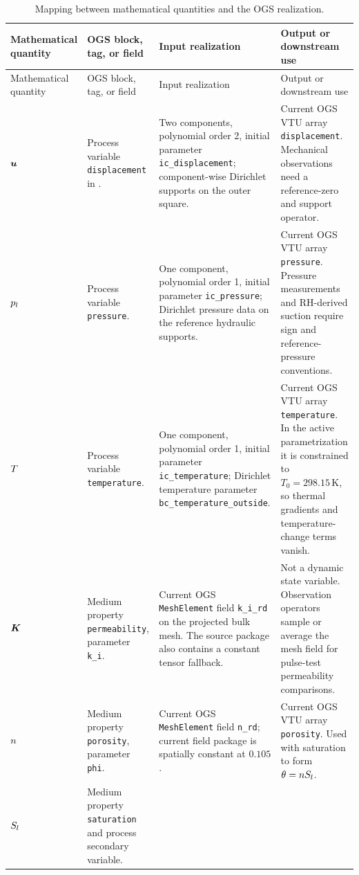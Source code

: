 \begingroup
\small
\setlength{\tabcolsep}{3pt}
\begin{longtable}{@{}L{0.15\textwidth} L{0.27\textwidth} L{0.25\textwidth} L{0.23\textwidth}@{}}
\caption{Mapping between mathematical quantities and the OGS realization.}
\label{tab:ogs-field-mapping}\\
\toprule
Mathematical quantity & OGS block, tag, or field & Input realization & Output or downstream use\\
\midrule
\endfirsthead
\toprule
Mathematical quantity & OGS block, tag, or field & Input realization & Output or downstream use\\
\midrule
\endhead
\bottomrule
\endlastfoot
\(\bm{u}\) &
Process variable \texttt{displacement} in . &
Two components, polynomial order 2, initial parameter \texttt{ic\_displacement};
component-wise Dirichlet supports on the outer square. &
Current OGS VTU array \texttt{displacement}.  Mechanical observations need a
reference-zero and support operator.\\
\(p_l\) &
Process variable \texttt{pressure}. &
One component, polynomial order 1, initial parameter \texttt{ic\_pressure};
Dirichlet pressure data on the reference hydraulic supports. &
Current OGS VTU array \texttt{pressure}.  Pressure measurements and RH-derived
suction require sign and reference-pressure conventions.\\
\(T\) &
Process variable \texttt{temperature}. &
One component, polynomial order 1, initial parameter \texttt{ic\_temperature};
Dirichlet temperature parameter \texttt{bc\_temperature\_outside}. &
Current OGS VTU array \texttt{temperature}.  In the active parametrization it is
constrained to \(T_0=298.15\,\mathrm{K}\), so thermal gradients and temperature-change
terms vanish.\\
\(\bm{K}\) &
Medium property \texttt{permeability}, parameter \texttt{k\_i}. &
Current OGS \texttt{MeshElement} field \texttt{k\_i\_rd} on the projected bulk mesh.
The source package also contains a constant tensor fallback. &
Not a dynamic state variable.  Observation operators sample or average the mesh
field for pulse-test permeability comparisons.\\
\(n\) &
Medium property \texttt{porosity}, parameter \texttt{phi}. &
Current OGS \texttt{MeshElement} field \texttt{n\_rd}; current field package is
spatially constant at \(0.105\). &
Current OGS VTU array \texttt{porosity}.  Used with saturation to form
\(\theta=nS_l\).\\
\(S_l\) &
Medium property \texttt{saturation} and process secondary variable. &

\end{longtable}
